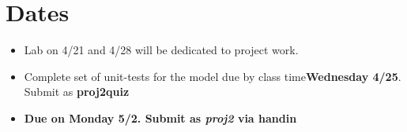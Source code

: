 \documentclass[]{tufte-handout}
\begin{document}
\section{Dates}

\begin{itemize}
\item Lab on 4/21 and 4/28 will be dedicated to project work.
\item Complete set of unit-tests for the model due by class time\textbf{Wednesday 4/25}. Submit as \textbf{proj2quiz}
\item \textbf{Due on Monday 5/2. Submit as \textit{proj2} via handin}
\end{itemize}
\end{document}

